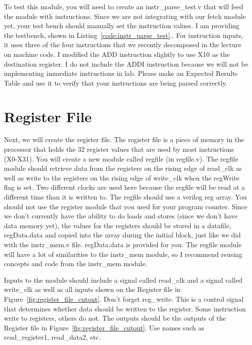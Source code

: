 To test this module, you will need to create an instr\_parse\_test.v that will feed the module with instructions.  Since we are not integrating with our fetch module yet, your test bench should manually set the instruction values.  I am providing the testbench, shown in Listing~\ref{code:instr_parse_test}..  For instruction inputs, it uses three of the four instructions that we recently decomposed in the lecture on machine code.  I modified the ADD instruction slightly to use X10 as the destination register.  I do not include the ADDI instruction because we will not be implementing immediate instructions in lab.  Please make an Expected Results Table and use it to verify that your instructions are being parsed correctly.


\section{Register File}

Next, we will create the register file.  The register file is a piece of memory in the processor that holds the 32 register values that are used by most instructions (X0-X31).  You will create a new module called regfile (in regfile.v).  The regfile module should retrieve data from the registers on the rising edge of read\_clk as well as write to the registers on the rising edge of write\_clk when the regWrite flag is set.  Two different clocks are used here because the regfile will be read at a different time than it is written to.  The regfile should use a verilog reg array.  You should not use the register module that you used for your program counter.  Since we don't currently have the ability to do loads and stores (since we don't have data memory yet), the values for the registers should be stored in a datafile, regData.data and copied into the array during the initial block, just like we did with the instr\_mem.v file.  regData.data is provided for you.  The regfile module will have a lot of similarities to the instr\_mem module, so I recommend reusing concepts and code from the instr\_mem module.

Inputs to the module should include a signal called read\_clk and a signal called write\_clk as well as all inputs shown on the Register file in Figure~\ref{fig:register_file_cutout}.  Don't forget reg\_write.  This is a control signal that determines whether data should be written to the register.  Some instruction write to registers, others do not.  The outputs should be the outputs of the Register file in Figure~\ref{fig:register_file_cutout}.  Use names such as read\_register1, read\_data2, etc.

